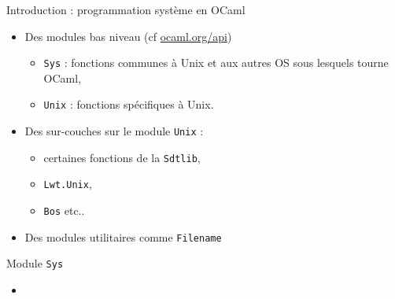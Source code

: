 
\begin{frame}{Introduction : programmation système en OCaml}

    \begin{itemize}[label=\small{}]
        \item Des modules bas niveau (cf \url{ocaml.org/api})
            \begin{itemize}[label=\small{}]
                \item \texttt{Sys} : fonctions communes à Unix et aux autres OS sous lesquels tourne OCaml,
                \item \texttt{Unix} : fonctions spécifiques à Unix.
            \end{itemize}
        \item Des sur-couches sur le module \texttt{Unix} :
            \begin{itemize}[label=\small{}]
                \item certaines fonctions de la \texttt{Sdtlib}, 
                \item \texttt{Lwt.Unix}, 
                \item \texttt{Bos} etc..
            \end{itemize}
        \item Des modules utilitaires comme \texttt{Filename}
    \end{itemize}

\end{frame}

\begin{frame}{Module \texttt{Sys}}
    \begin{itemize}[label=\small{}]
        \item \wip
    \end{itemize}
\end{frame}


